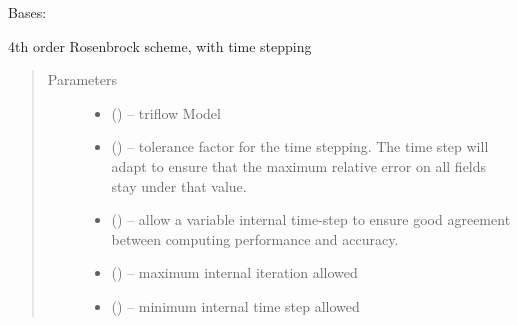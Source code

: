 \documentclass[letterpaper,10pt,english]{sphinxmanual}
\begin{document}
\begin{fulllineitems}
\label{\detokenize{triflow.plugins:triflow.plugins.schemes.ROS3PRL}}
Bases: {\hyperref[\detokenize{triflow.plugins:triflow.plugins.schemes.ROW_general}]{}}

4th order Rosenbrock scheme, with time stepping
\begin{quote}\begin{description}
\item[{Parameters}] \leavevmode\begin{itemize}
\item {} 
 () -- triflow Model

\item {} 
 (\sphinxstyleliteralemphasis{, }\sphinxstyleliteralemphasis{, }) -- tolerance factor for the time stepping. The time step will adapt to ensure that the maximum relative error on all fields stay under that value.

\item {} 
 (\sphinxstyleliteralemphasis{, }\sphinxstyleliteralemphasis{, }) -- allow a variable internal time-step to ensure good agreement between computing performance and accuracy.

\item {} 
 (\sphinxstyleliteralemphasis{, }\sphinxstyleliteralemphasis{, }) -- maximum internal iteration allowed

\item {} 
 (\sphinxstyleliteralemphasis{, }\sphinxstyleliteralemphasis{, }) -- minimum internal time step allowed

\end{itemize}

\end{description}\end{quote}

\end{fulllineitems}
\end{document}
